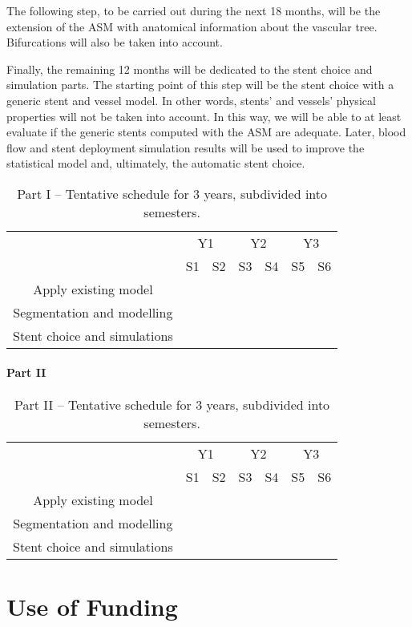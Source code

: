 The following step, to be carried out during the next 18 months, will be the extension of the ASM with anatomical information about the vascular tree. Bifurcations will also be taken into account. 

Finally, the remaining 12 months will be dedicated to the stent choice and simulation parts. The starting point of this step will be the stent choice with a generic stent and vessel model. In other words, stents' and vessels' physical properties will not be taken into account. In this way, we will be able to at least evaluate if the generic stents computed with the ASM are adequate. Later, blood flow and stent deployment simulation results will be used to improve the statistical model and, ultimately, the automatic stent choice.  

\begin{table}[h]\centering
\begin{tabular}{c|c|c|c|c|c|c|}
\cline{2-7}
 & \multicolumn{2}{|c|}{Y1} & \multicolumn{2}{|c|}{Y2} & \multicolumn{2}{|c|}{Y3} \\ \cline{2-7}
 & S1 & S2 & S3 & S4 & S5 & S6 \\ \hline
\multicolumn{1}{|c|}{Apply existing model} & \cellcolor{green} & & & & & \\ \hline
\multicolumn{1}{|c|}{Segmentation and modelling} & & \cellcolor{green} & \cellcolor{green} & \cellcolor{green} & & \\ \hline
\multicolumn{1}{|c|}{Stent choice and simulations} & & & & & \cellcolor{green} & \cellcolor{green} \\ \hline
\end{tabular}
\caption{Part I -- Tentative schedule for 3 years, subdivided into semesters.}
\label{tab:schedule1}
\end{table}

\paragraph{Part II}

\begin{table}[h]\centering
\begin{tabular}{c|c|c|c|c|c|c|}
\cline{2-7}
 & \multicolumn{2}{|c|}{Y1} & \multicolumn{2}{|c|}{Y2} & \multicolumn{2}{|c|}{Y3} \\ \cline{2-7}
 & S1 & S2 & S3 & S4 & S5 & S6 \\ \hline
\multicolumn{1}{|c|}{Apply existing model} & \cellcolor{green} & & & & & \\ \hline
\multicolumn{1}{|c|}{Segmentation and modelling} & & \cellcolor{green} & \cellcolor{green} & \cellcolor{green} & & \\ \hline
\multicolumn{1}{|c|}{Stent choice and simulations} & & & & & \cellcolor{green} & \cellcolor{green} \\ \hline
\end{tabular}
\caption{Part II -- Tentative schedule for 3 years, subdivided into semesters.}
\label{tab:schedule2}
\end{table}


\section{Use of Funding}
